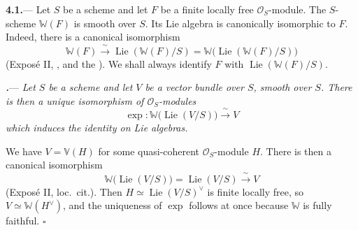 
\par\medskip\noindent
\textbf{4.1.}---
Let \(S\) be a scheme and let \(F\) be a finite locally free
\(\mathcal O_S\)-module.  The \(S\)-scheme \(\mathbb W(F)\) is smooth
over \(S\).  Its Lie algebra is canonically isomorphic to \(F\).
Indeed, there is a canonical isomorphism
\[
  \mathbb W(F)
  \xrightarrow{\ \sim\ }
  \operatorname{Lie}(\mathbb W(F)/S)
  =
  \mathbb W\bigl(\operatorname{Lie}(\mathbb W(F)/S)\bigr)
\]
\textup{(Exposé II, , and the
)}.  We shall always identify
\(F\) with \(\operatorname{Lie}(\mathbb W(F)/S)\).

\par\medskip\noindent
\textbf{\textit{.}}---
\textit{Let \(S\) be a scheme and let \(V\) be a vector bundle over
\(S\), smooth over \(S\).  There is then a unique isomorphism of
\(\mathcal O_S\)-modules}
\[
  \exp\colon
  \mathbb W\bigl(\operatorname{Lie}(V/S)\bigr)
  \xrightarrow{\ \sim\ } V
\]
\textit{which induces the identity on Lie algebras.}

We have \(V=\mathbb V(H)\) for some quasi-coherent
\(\mathcal O_S\)-module \(H\).  There is then a canonical isomorphism
\[
  \mathbb W\bigl(\operatorname{Lie}(V/S)\bigr)
  =
  \operatorname{Lie}(V/S)
  \xrightarrow{\ \sim\ }
  V
\]
(Exposé II, loc.\ cit.).  Then \(H\simeq\operatorname{Lie}(V/S)^\vee\) is
finite locally free, so \(V\simeq\mathbb W(H^\vee)\), and the uniqueness of
\(\exp\) follows at once because \(\mathbb W\) is fully faithful.
\hfill\(\square\)

